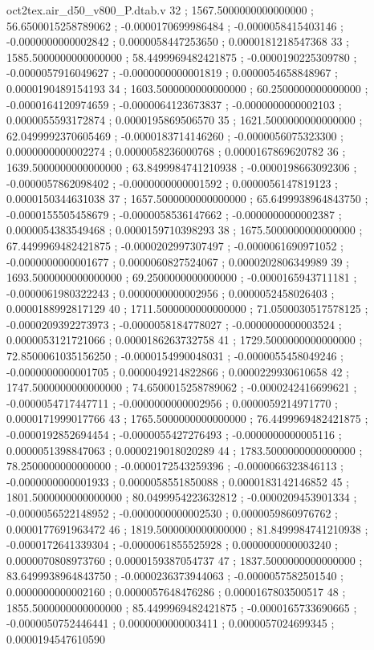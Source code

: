 \begin{filecontents}[overwrite]{oct2tex.air_d50_v800_P.dtab.v}
32 ; 1567.5000000000000000 ; 56.6500015258789062 ; -0.0000170699986484 ; -0.0000058415403146 ; -0.0000000000002842 ; 0.0000058447253650 ; 0.0000181218547368
33 ; 1585.5000000000000000 ; 58.4499969482421875 ; -0.0000190225309780 ; -0.0000057916049627 ; -0.0000000000001819 ; 0.0000054658848967 ; 0.0000190489154193
34 ; 1603.5000000000000000 ; 60.2500000000000000 ; -0.0000164120974659 ; -0.0000064123673837 ; -0.0000000000002103 ; 0.0000055593172874 ; 0.0000195869506570
35 ; 1621.5000000000000000 ; 62.0499992370605469 ; -0.0000183714146260 ; -0.0000056075323300 ; 0.0000000000002274 ; 0.0000058236000768 ; 0.0000167869620782
36 ; 1639.5000000000000000 ; 63.8499984741210938 ; -0.0000198663092306 ; -0.0000057862098402 ; -0.0000000000001592 ; 0.0000056147819123 ; 0.0000150344631038
37 ; 1657.5000000000000000 ; 65.6499938964843750 ; -0.0000155505458679 ; -0.0000058536147662 ; -0.0000000000002387 ; 0.0000054383549468 ; 0.0000159710398293
38 ; 1675.5000000000000000 ; 67.4499969482421875 ; -0.0000202997307497 ; -0.0000061690971052 ; -0.0000000000001677 ; 0.0000060827524067 ; 0.0000202806349989
39 ; 1693.5000000000000000 ; 69.2500000000000000 ; -0.0000165943711181 ; -0.0000061980322243 ; 0.0000000000002956 ; 0.0000052458026403 ; 0.0000188992817129
40 ; 1711.5000000000000000 ; 71.0500030517578125 ; -0.0000209392273973 ; -0.0000058184778027 ; -0.0000000000003524 ; 0.0000053121721066 ; 0.0000186263732758
41 ; 1729.5000000000000000 ; 72.8500061035156250 ; -0.0000154990048031 ; -0.0000055458049246 ; -0.0000000000001705 ; 0.0000049214822866 ; 0.0000229930610658
42 ; 1747.5000000000000000 ; 74.6500015258789062 ; -0.0000242416699621 ; -0.0000054717447711 ; -0.0000000000002956 ; 0.0000059214971770 ; 0.0000171999017766
43 ; 1765.5000000000000000 ; 76.4499969482421875 ; -0.0000192852694454 ; -0.0000055427276493 ; -0.0000000000005116 ; 0.0000051398847063 ; 0.0000219018020289
44 ; 1783.5000000000000000 ; 78.2500000000000000 ; -0.0000172543259396 ; -0.0000066323846113 ; -0.0000000000001933 ; 0.0000058551850088 ; 0.0000183142146852
45 ; 1801.5000000000000000 ; 80.0499954223632812 ; -0.0000209453901334 ; -0.0000056522148952 ; -0.0000000000002530 ; 0.0000059860976762 ; 0.0000177691963472
46 ; 1819.5000000000000000 ; 81.8499984741210938 ; -0.0000172641339304 ; -0.0000061855525928 ; 0.0000000000003240 ; 0.0000070808973760 ; 0.0000159387054737
47 ; 1837.5000000000000000 ; 83.6499938964843750 ; -0.0000236373944063 ; -0.0000057582501540 ; 0.0000000000002160 ; 0.0000057648476286 ; 0.0000167803500517
48 ; 1855.5000000000000000 ; 85.4499969482421875 ; -0.0000165733690665 ; -0.0000050752446441 ; 0.0000000000003411 ; 0.0000057024699345 ; 0.0000194547610590

\end{filecontents}
